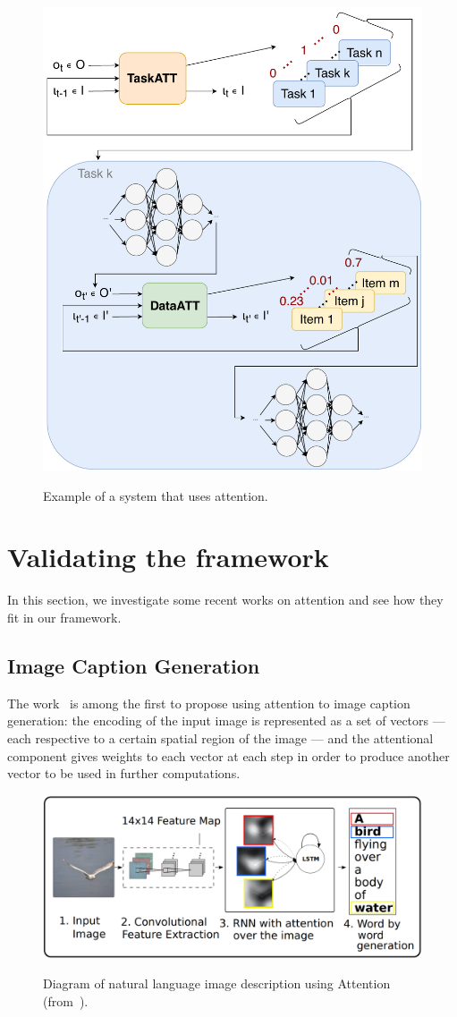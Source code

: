\documentclass[11pt]{article}
\begin{document}
\begin{figure}[H]
    \centering
    \includegraphics[width=0.7\linewidth]{./img/att_blocks_example.pdf}\label{fig:attsystem}
    \caption{Example of a system that uses attention.}
\end{figure}

\section{Validating the framework}
In this section, we investigate some recent works on attention and see how they fit in our framework.

\subsection{Image Caption Generation}
The work~\cite{ref:show-attend-tell} is among the first to propose using
attention to image caption generation: the encoding of the input image is
represented as a set of vectors --- each respective to a certain spatial region of the image ---
and the attentional component gives weights to each vector at each step in order to produce another
vector to be used in further computations.

\begin{figure}[H]
    \centering
    \includegraphics[width=0.8\linewidth]{./img/img_captioning.png}\label{fig:imgcaptioning}
    \caption{Diagram of natural language image description using Attention
    (from~\cite{ref:img-captioning}).}
\end{figure}
\end{document}
